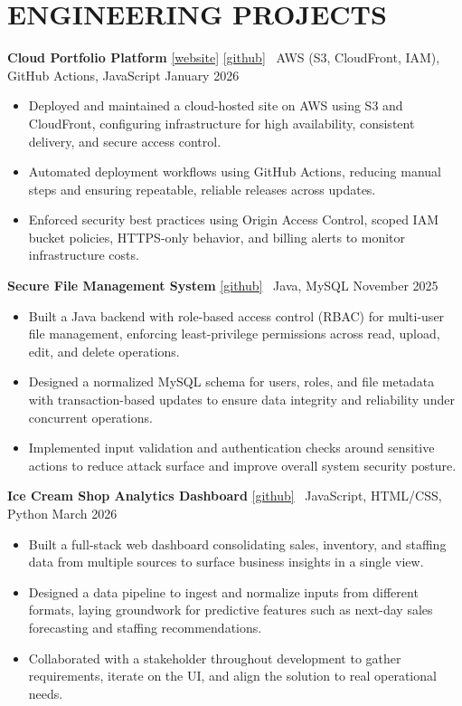 \documentclass[letterpaper,11pt]{article}
\begin{document}
\section{ENGINEERING PROJECTS}
\noindent\textbf{Cloud Portfolio Platform} \href{https://d3mte3hn7uzxb.cloudfront.net}{[website]} \href{https://github.com/Gogeta0011/Portfolio-Website}{[github]} \textbar\ AWS (S3, CloudFront, IAM), GitHub Actions, JavaScript \hfill January 2026
\begin{itemize}
  \item Deployed and maintained a cloud-hosted site on AWS using S3 and CloudFront, configuring infrastructure for high availability, consistent delivery, and secure access control.
  \item Automated deployment workflows using GitHub Actions, reducing manual steps and ensuring repeatable, reliable releases across updates.
  \item Enforced security best practices using Origin Access Control, scoped IAM bucket policies, HTTPS-only behavior, and billing alerts to monitor infrastructure costs.
\end{itemize}
\noindent\textbf{Secure File Management System} \href{https://github.com/Gogeta0011/Secure-File-Management}{[github]} \textbar\ Java, MySQL \hfill November 2025
\begin{itemize}
  \item Built a Java backend with role-based access control (RBAC) for multi-user file management, enforcing least-privilege permissions across read, upload, edit, and delete operations.
  \item Designed a normalized MySQL schema for users, roles, and file metadata with transaction-based updates to ensure data integrity and reliability under concurrent operations.
  \item Implemented input validation and authentication checks around sensitive actions to reduce attack surface and improve overall system security posture.
\end{itemize}
\noindent\textbf{Ice Cream Shop Analytics Dashboard} \href{https://github.com/Gogeta0011/Ice-Cream-Shop-Analytics-Dashboard}{[github]} \textbar\ JavaScript, HTML/CSS, Python \hfill March 2026
\begin{itemize}
  \item Built a full-stack web dashboard consolidating sales, inventory, and staffing data from multiple sources to surface business insights in a single view.
  \item Designed a data pipeline to ingest and normalize inputs from different formats, laying groundwork for predictive features such as next-day sales forecasting and staffing recommendations.
  \item Collaborated with a stakeholder throughout development to gather requirements, iterate on the UI, and align the solution to real operational needs.
\end{itemize}
\end{document}
